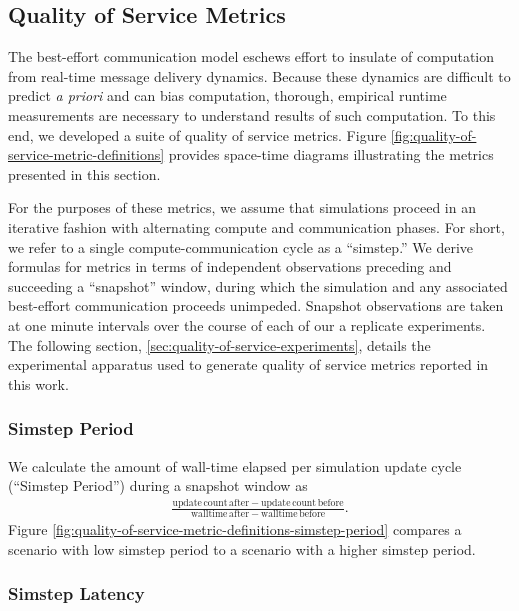 \subsection{Quality of Service Metrics} \label{sec:quality-of-service-metrics}



The best-effort communication model eschews effort to insulate of computation from real-time message delivery dynamics.
Because these dynamics are difficult to predict \textit{a priori} and can bias computation, thorough, empirical runtime measurements are necessary to understand results of such computation.
To this end, we developed a suite of quality of service metrics.
Figure \ref{fig:quality-of-service-metric-definitions} provides space-time diagrams illustrating the metrics presented in this section.

For the purposes of these metrics, we assume that simulations proceed in an iterative fashion with alternating compute and communication phases.
For short, we refer to a single compute-communication cycle as a ``simstep.''
We derive formulas for metrics in terms of independent observations preceding and succeeding a ``snapshot'' window, during which the simulation and any associated best-effort communication proceeds unimpeded.
Snapshot observations are taken at one minute intervals over the course of each of our a replicate experiments.
The following section, \ref{sec:quality-of-service-experiments}, details the experimental apparatus used to generate quality of service metrics reported in this work.

\subsubsection{Simstep Period} \label{sec:simstep-period-metric}

We calculate the amount of wall-time elapsed per simulation update cycle (``Simstep Period'') during a snapshot window as
\begin{align*}
\frac{
  \mathrm{update\,count\,after} - \mathrm{update\,count\,before}
}{
  \mathrm{walltime\,after} - \mathrm{walltime\,before}
}.
\end{align*}
Figure \ref{fig:quality-of-service-metric-definitions-simstep-period} compares a scenario with low simstep period to a scenario with a higher simstep period.

\subsubsection{Simstep Latency} \label{sec:wall-time-latency-metric}

